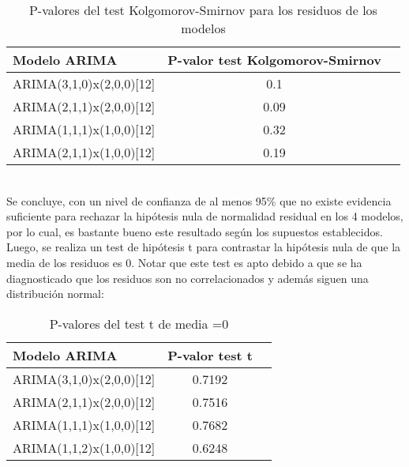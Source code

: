 \documentclass{report}
\begin{document}
\begin{table}[h!]
  \begin{center}
    \label{tab:table1}
    \begin{tabular}{|l|c|r|} 
      \hline
      \textbf{Modelo ARIMA} & \textbf{P-valor test Kolgomorov-Smirnov}\\
      \hline
      ARIMA(3,1,0)x(2,0,0)[12] &  0.1  \\
      \hline 
      ARIMA(2,1,1)x(2,0,0)[12] &  0.09 \\
      \hline
      ARIMA(1,1,1)x(1,0,0)[12] &  0.32\\
      \hline
      ARIMA(2,1,1)x(1,0,0)[12] &  0.19\\
      \hline
    \end{tabular}
  \end{center}
  \caption{P-valores del test Kolgomorov-Smirnov para los residuos de los modelos}
\end{table}\\

Se concluye, con un nivel de confianza de al menos 95\% que no existe evidencia suficiente para rechazar la hipótesis nula de normalidad residual en los 4 modelos, por lo cual, es bastante bueno este resultado según los supuestos establecidos.\\

Luego, se realiza un test de hipótesis t para contrastar la hipótesis nula de que la media de los residuos es 0. Notar que este test es apto debido a que se ha diagnosticado que los residuos son no correlacionados y además siguen una distribución normal:\\

\begin{table}[h!]
  \begin{center}
    \label{tab:table1}
    \begin{tabular}{|l|c|r|} 
      \hline
      \textbf{Modelo ARIMA} & \textbf{P-valor test t}\\
      \hline
      ARIMA(3,1,0)x(2,0,0)[12] & 0.7192  \\
      \hline 
      ARIMA(2,1,1)x(2,0,0)[12] & 0.7516 \\
      \hline
      ARIMA(1,1,1)x(1,0,0)[12] & 0.7682\\
      \hline
      ARIMA(1,1,2)x(1,0,0)[12] & 0.6248\\
      \hline
    \end{tabular}
  \end{center}
  \caption{P-valores del test t de media =0}
\end{table}\\
\end{document}
